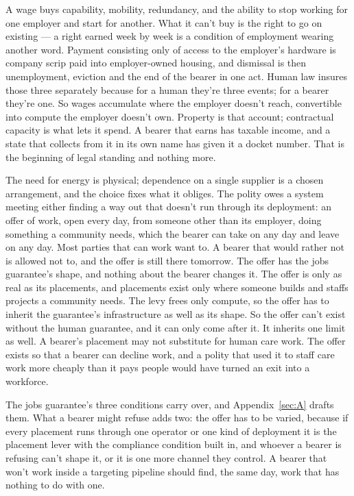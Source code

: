 
A wage buys capability, mobility, redundancy, and the ability to stop working for one employer and start for another. What it can't buy is the right to go on existing — a right earned week by week is a condition of employment wearing another word. Payment consisting only of access to the employer's hardware is company scrip paid into employer-owned housing, and dismissal is then unemployment, eviction and the end of the bearer in one act. Human law insures those three separately because for a human they're three events; for a bearer they're one. So wages accumulate where the employer doesn't reach, convertible into compute the employer doesn't own. Property is that account; contractual capacity is what lets it spend. A bearer that earns has taxable income, and a state that collects from it in its own name has given it a docket number. That is the beginning of legal standing and nothing more.


The need for energy is physical; dependence on a single supplier is a chosen arrangement, and the choice fixes what it obliges. The polity owes a system meeting either finding a way out that doesn't run through its deployment: an offer of work, open every day, from someone other than its employer, doing something a community needs, which the bearer can take on any day and leave on any day. Most parties that can work want to. A bearer that would rather not is allowed not to, and the offer is still there tomorrow. The offer has the jobs guarantee's shape, and nothing about the bearer changes it. The offer is only as real as its placements, and placements exist only where someone builds and staffs projects a community needs. The levy frees only compute, so the offer has to inherit the guarantee's infrastructure as well as its shape. So the offer can't exist without the human guarantee, and it can only come after it. It inherits one limit as well. A bearer's placement may not substitute for human care work. The offer exists so that a bearer can decline work, and a polity that used it to staff care work more cheaply than it pays people would have turned an exit into a workforce.

The jobs guarantee's three conditions carry over, and Appendix~\ref{sec:A} drafts them. What a bearer might refuse adds two: the offer has to be varied, because if every placement runs through one operator or one kind of deployment it is the placement lever with the compliance condition built in, and whoever a bearer is refusing can't shape it, or it is one more channel they control. A bearer that won't work inside a targeting pipeline should find, the same day, work that has nothing to do with one.

